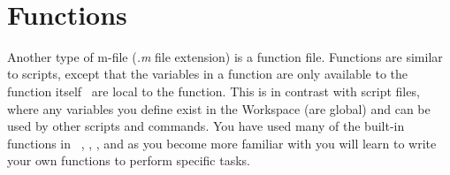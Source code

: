 \addtolength{\parindent}{4mm}
\vspace{5mm}

\addtolength{\parindent}{-4mm}
\\
\addtolength{\parindent}{4mm}

\section{Functions}\label{sec:functions}
Another type of m-file (\textit{.m} file extension) is a function file. Functions are similar to scripts, except that the variables in a function are only available to the function itself \ie\ are local to the function. This is in contrast with script files, where any variables you define exist in the  Workspace (are global) and can be used by other scripts and commands. You have used many of the built-in functions in \mlab \eg\ , ,  \etc, and as you become more familiar with \mlab you will learn to write your own functions to perform specific tasks. 

